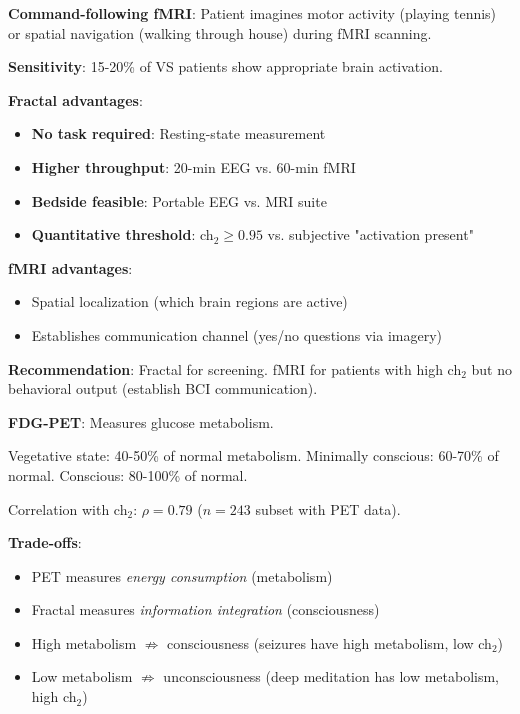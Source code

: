 \begin{comparison}
\textbf{Command-following fMRI}\cite{owen2006}: Patient imagines motor activity (playing tennis) or spatial navigation (walking through house) during fMRI scanning.

\textbf{Sensitivity}: 15-20\% of VS patients show appropriate brain activation.

\textbf{Fractal advantages}:
\begin{itemize}
\item \textbf{No task required}: Resting-state measurement
\item \textbf{Higher throughput}: 20-min EEG vs. 60-min fMRI
\item \textbf{Bedside feasible}: Portable EEG vs. MRI suite
\item \textbf{Quantitative threshold}: ch$_2 \geq 0.95$ vs. subjective "activation present"
\end{itemize}

\textbf{fMRI advantages}:
\begin{itemize}
\item Spatial localization (which brain regions are active)
\item Establishes communication channel (yes/no questions via imagery)
\end{itemize}

\textbf{Recommendation}: Fractal for screening. fMRI for patients with high ch$_2$ but no behavioral output (establish BCI communication).
\end{comparison}

\begin{comparison}
\textbf{FDG-PET}: Measures glucose metabolism\cite{laureys2004}.

Vegetative state: 40-50\% of normal metabolism.
Minimally conscious: 60-70\% of normal.
Conscious: 80-100\% of normal.

Correlation with ch$_2$: $\rho = 0.79$ ($n = 243$ subset with PET data).

\textbf{Trade-offs}:
\begin{itemize}
\item PET measures \textit{energy consumption} (metabolism)
\item Fractal measures \textit{information integration} (consciousness)
\item High metabolism $\not\Rightarrow$ consciousness (seizures have high metabolism, low ch$_2$)
\item Low metabolism $\not\Rightarrow$ unconsciousness (deep meditation has low metabolism, high ch$_2$)
\end{itemize}
\end{comparison}

